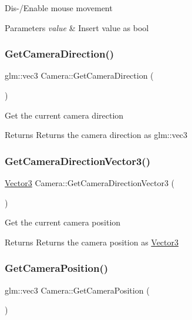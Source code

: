 Dis-\//\+Enable mouse movement 
\begin{DoxyParams}{Parameters}
{\em value} & Insert value as bool \\
\hline
\end{DoxyParams}
\mbox{\label{class_camera_a988589852d490dd0f4824127372464ed}} 
\subsubsection{\texorpdfstring{GetCameraDirection()}{GetCameraDirection()}}
{\footnotesize\ttfamily glm\+::vec3 Camera\+::\+Get\+Camera\+Direction (\begin{DoxyParamCaption}{ }\end{DoxyParamCaption})}

Get the current camera direction \begin{DoxyReturn}{Returns}
Returns the camera direction as glm\+::vec3 
\end{DoxyReturn}
\mbox{\label{class_camera_a348047d7ebbd504a0da83fc4a6d60809}} 
\subsubsection{\texorpdfstring{GetCameraDirectionVector3()}{GetCameraDirectionVector3()}}
{\footnotesize\ttfamily \mbox{\hyperlink{struct_vector3}{Vector3}} Camera\+::\+Get\+Camera\+Direction\+Vector3 (\begin{DoxyParamCaption}{ }\end{DoxyParamCaption})}

Get the current camera position \begin{DoxyReturn}{Returns}
Returns the camera position as \mbox{\hyperlink{struct_vector3}{Vector3}} 
\end{DoxyReturn}
\mbox{\label{class_camera_a948a60a6eb780a313ed59690bbaef811}} 
\subsubsection{\texorpdfstring{GetCameraPosition()}{GetCameraPosition()}}
{\footnotesize\ttfamily glm\+::vec3 Camera\+::\+Get\+Camera\+Position (\begin{DoxyParamCaption}{ }\end{DoxyParamCaption})}

